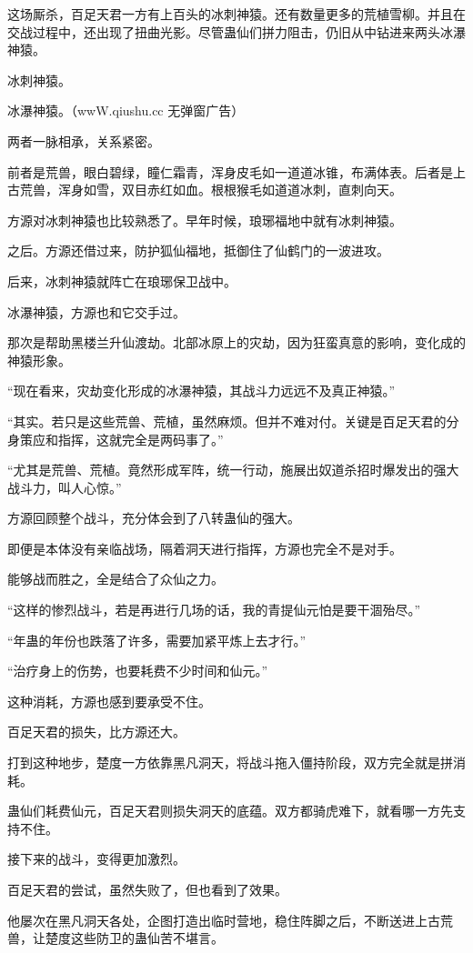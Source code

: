 \begin{this_body}
这场厮杀，百足天君一方有上百头的冰刺神猿。还有数量更多的荒植雪柳。并且在交战过程中，还出现了扭曲光影。尽管蛊仙们拼力阻击，仍旧从中钻进来两头冰瀑神猿。

冰刺神猿。

冰瀑神猿。（wwW.qiushu.cc 无弹窗广告）

两者一脉相承，关系紧密。

前者是荒兽，眼白碧绿，瞳仁霜青，浑身皮毛如一道道冰锥，布满体表。后者是上古荒兽，浑身如雪，双目赤红如血。根根猴毛如道道冰刺，直刺向天。

方源对冰刺神猿也比较熟悉了。早年时候，琅琊福地中就有冰刺神猿。

之后。方源还借过来，防护狐仙福地，抵御住了仙鹤门的一波进攻。

后来，冰刺神猿就阵亡在琅琊保卫战中。

冰瀑神猿，方源也和它交手过。

那次是帮助黑楼兰升仙渡劫。北部冰原上的灾劫，因为狂蛮真意的影响，变化成的神猿形象。

“现在看来，灾劫变化形成的冰瀑神猿，其战斗力远远不及真正神猿。”

“其实。若只是这些荒兽、荒植，虽然麻烦。但并不难对付。关键是百足天君的分身策应和指挥，这就完全是两码事了。”

“尤其是荒兽、荒植。竟然形成军阵，统一行动，施展出奴道杀招时爆发出的强大战斗力，叫人心惊。”

方源回顾整个战斗，充分体会到了八转蛊仙的强大。

即便是本体没有亲临战场，隔着洞天进行指挥，方源也完全不是对手。

能够战而胜之，全是结合了众仙之力。

“这样的惨烈战斗，若是再进行几场的话，我的青提仙元怕是要干涸殆尽。”

“年蛊的年份也跌落了许多，需要加紧平炼上去才行。”

“治疗身上的伤势，也要耗费不少时间和仙元。”

这种消耗，方源也感到要承受不住。

百足天君的损失，比方源还大。

打到这种地步，楚度一方依靠黑凡洞天，将战斗拖入僵持阶段，双方完全就是拼消耗。

蛊仙们耗费仙元，百足天君则损失洞天的底蕴。双方都骑虎难下，就看哪一方先支持不住。

接下来的战斗，变得更加激烈。

百足天君的尝试，虽然失败了，但也看到了效果。

他屡次在黑凡洞天各处，企图打造出临时营地，稳住阵脚之后，不断送进上古荒兽，让楚度这些防卫的蛊仙苦不堪言。


\end{this_body}
